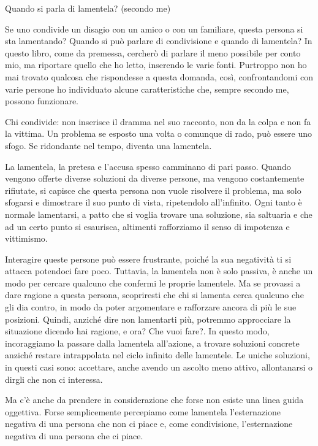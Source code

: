 \documentclass[12pt]{book} %
\begin{document}
\begin{mdframed}[linewidth=1pt]
Quando si parla di lamentela? (secondo me)

Se uno condivide un disagio con un amico o con un familiare, questa persona si sta lamentando? Quando si può parlare di
condivisione e quando di lamentela? In questo libro, come da premessa, cercherò di parlare il meno possibile per conto
mio, ma riportare quello che ho letto, inserendo le varie fonti. Purtroppo non ho mai trovato qualcosa che rispondesse
a questa domanda, così, confrontandomi con varie persone ho individuato alcune caratteristiche che, sempre secondo me,
possono funzionare. 

Chi condivide: non inserisce il {\textquotedbl}dramma{\textquotedbl} nel suo racconto, non da la colpa e non fa la
vittima. Un problema se esposto una volta o comunque di rado, può essere uno sfogo. Se ridondante nel tempo, diventa
una lamentela.

La lamentela, la pretesa e l'accusa spesso camminano di pari passo. Quando vengono offerte diverse soluzioni da diverse
persone, ma vengono costantemente rifiutate, si capisce che questa persona non vuole risolvere il problema, ma solo
sfogarsi e dimostrare il suo punto di vista, ripetendolo all'infinito. Ogni tanto è normale lamentarsi, a patto che si voglia trovare una soluzione, sia saltuaria e che ad un certo punto si esaurisca, altimenti rafforziamo il senso di impotenza e vittimismo.

Interagire queste persone può essere frustrante,
poiché la sua negatività ti si attacca potendoci fare poco. Tuttavia, la lamentela non è solo passiva, è anche un modo
per cercare qualcuno che confermi le proprie lamentele. Ma se provassi a dare ragione a questa persona, scopriresti che
chi si lamenta cerca qualcuno che gli dia contro, in modo da poter argomentare e rafforzare ancora di più le sue
posizioni. Quindi, anziché dire {\textquotedbl}non lamentarti più{\textquotedbl}, potremmo approcciare la situazione
dicendo {\textquotedbl}hai ragione, e ora? Che vuoi fare?{\textquotedbl}. In questo modo, incoraggiamo la passare dalla
lamentela all'azione, a trovare soluzioni concrete anziché restare intrappolata nel ciclo infinito delle lamentele. Le
uniche soluzioni, in questi casi sono: accettare, anche avendo un ascolto meno attivo, allontanarsi o dirgli che non ci
interessa.

Ma c'è anche da prendere in considerazione che forse non esiste una linea guida oggettiva. Forse
semplicemente percepiamo come lamentela l'esternazione negativa di una persona che non ci piace e, come condivisione,
l'esternazione negativa di una persona che ci piace.


\end{mdframed}
\end{document}
